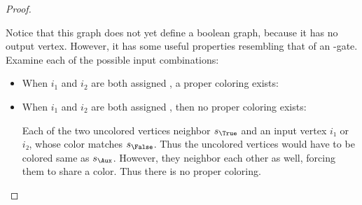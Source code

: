 \begin{proof}
\begin{description}
\begin{aside}
      Notice that this graph does not yet define a boolean graph, because it has
      no output vertex.  However, it has some useful properties resembling that
      of an \OR-gate.  Examine each of the possible input combinations:
      \begin{itemize}
        \item When \(i_1\) and \(i_2\) are both assigned \True, a proper
          coloring exists:
          \begin{center}
          \end{center}

        \item When \(i_1\) and \(i_2\) are both assigned \False, then no proper
          coloring exists:
          \begin{center}
          \end{center}

          Each of the two uncolored vertices neighbor \(s_\True\) and an input
          vertex \(i₁\) or \(i₂\), whose color matches \(s_\False\).  Thus the
          uncolored vertices would have to be colored same as \(s_\Aux\).
          However, they neighbor each other as well, forcing them to share a
          color.  Thus there is no proper coloring.


\end{itemize}
\end{aside}
\end{description}
\end{proof}
